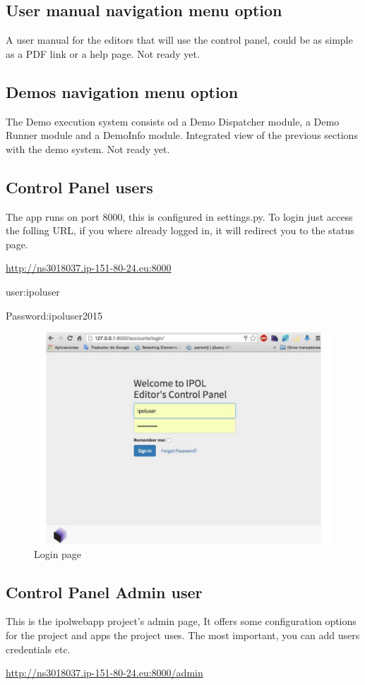 \subsection{User manual navigation menu option}
A user manual for the editors that will use the control panel, could be as simple as a PDF link or a help page.
Not ready yet.

\subsection{Demos navigation menu option}
The Demo execution system consists od a Demo Dispatcher module, a Demo Runner module and a DemoInfo module.
Integrated view of the previous sections with the demo system.
Not ready yet.

\subsection{Control Panel users}
The app runs on port 8000, this is configured in settings.py.
To login just access the folling URL, if you where already logged in, it will redirect you to the status page.

\url{http://ns3018037.ip-151-80-24.eu:8000}

user:ipoluser

Password:ipoluser2015

\begin{figure}[!ht]
\centering
\includegraphics[width=0.5\columnwidth]{images/login.pdf}
\caption{Login page} 
\label{fi:login_page}
\end{figure}

\subsection{Control Panel Admin user}
This is the ipolwebapp project's admin page, 
It offers some configuration options for the project and apps the project uses. The most important, you can add users credentials etc.

\url{http://ns3018037.ip-151-80-24.eu:8000/admin}

